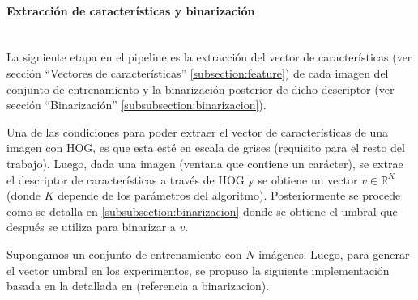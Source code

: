 
		\paragraph{Extracción de características y binarización} ~\\
		
			La siguiente etapa en el pipeline es la extracción del vector de características (ver sección ``Vectores de características'' \ref{subsection:feature}) de cada imagen del conjunto de entrenamiento y la binarización posterior de dicho descriptor (ver sección ``Binarización'' \ref{subsubsection:binarizacion}).
			
			Una de las condiciones para poder extraer el vector de características de una imagen con HOG, es que esta esté en escala de grises (requisito para el resto del trabajo). Luego, dada una imagen (ventana que contiene un carácter), se extrae el descriptor de características a través de HOG y se obtiene un vector $v \in \mathbb{R}^{K}$ (donde $K$ depende de los parámetros del algoritmo). Posteriormente se procede como se detalla en \ref{subsubsection:binarizacion} donde se obtiene el umbral que después se utiliza para binarizar a $v$.
			
			Supongamos un conjunto de entrenamiento con $N$ imágenes. Luego, para generar el vector umbral en los experimentos, se propuso la siguiente implementación basada en la detallada en (referencia a binarizacion).
			
